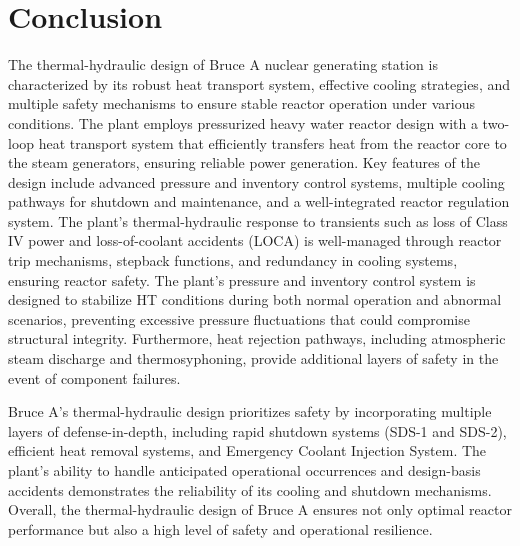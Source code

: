 \documentclass[12pt]{article}
\begin{document}
\section{Conclusion}

The thermal-hydraulic design of Bruce A nuclear generating station is characterized by its robust heat transport system, effective cooling strategies, and multiple safety mechanisms to ensure stable reactor operation under various conditions. The plant employs pressurized heavy water reactor design with a two-loop heat transport system that efficiently transfers heat from the reactor core to the steam generators, ensuring reliable power generation. Key features of the design include advanced pressure and inventory control systems, multiple cooling pathways for shutdown and maintenance, and a well-integrated reactor regulation system. The plant's thermal-hydraulic response to transients such as loss of Class IV power and loss-of-coolant accidents (LOCA) is well-managed through reactor trip mechanisms, stepback functions, and redundancy in cooling systems, ensuring reactor safety. The plant's pressure and inventory control system is designed to stabilize HT conditions during both normal operation and abnormal scenarios, preventing excessive pressure fluctuations that could compromise structural integrity. Furthermore, heat rejection pathways, including atmospheric steam discharge and thermosyphoning, provide additional layers of safety in the event of component failures.

Bruce A’s thermal-hydraulic design prioritizes safety by incorporating multiple layers of defense-in-depth, including rapid shutdown systems (SDS-1 and SDS-2), efficient heat removal systems, and Emergency Coolant Injection System. The plant's ability to handle anticipated operational occurrences and design-basis accidents demonstrates the reliability of its cooling and shutdown mechanisms. Overall, the thermal-hydraulic design of Bruce A ensures not only optimal reactor performance but also a high level of safety and operational resilience.




\end{document}
